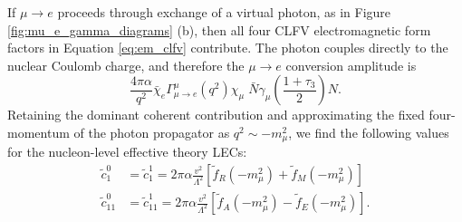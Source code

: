 \documentclass{book}[letterpaper,12pt]
\begin{document}
If $\mu\rightarrow e$ proceeds through exchange of a virtual photon, as in Figure \ref{fig:mu_e_gamma_diagrams} (b), then all four CLFV electromagnetic form factors in Equation \ref{eq:em_clfv} contribute. The photon couples directly to the nuclear Coulomb charge, and therefore the $\mu\rightarrow e$ conversion amplitude is
\begin{equation}
\frac{4\pi\alpha}{q^2}\bar{\chi}_e\Gamma^{\mu}_{\mu\rightarrow e}(q^2)\chi_{\mu}\;\bar{N}\gamma_{\mu}\left(\frac{1+\tau_3}{2}\right)N.
\end{equation}
Retaining the dominant coherent contribution and approximating the fixed four-momentum of the photon propagator as $q^2\sim -m_{\mu}^2$, we find the following values for the nucleon-level effective theory LECs:
\begin{equation}
\begin{split}
\tilde{c}_1^0&=\tilde{c}_1^1=2\pi\alpha\frac{v^2}{\Lambda^2}\left[\tilde{f}_R(-m_{\mu}^2)+\tilde{f}_M(-m_{\mu}^2)\right]\\
\tilde{c}_{11}^0&=\tilde{c}_{11}^1=2\pi\alpha\frac{v^2}{\Lambda^2}\left[\tilde{f}_A(-m_{\mu}^2)-\tilde{f}_E(-m_{\mu}^2)\right].
\end{split}
\end{equation}
\end{document}
